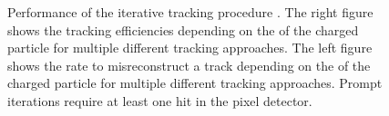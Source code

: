 \begin{figure}[htbp!]
  \begin{center}
\caption{Performance of the iterative tracking procedure \cite{Sirunyan:2017ulk}. The right figure shows the tracking efficiencies depending on the \pt of the charged particle for multiple different tracking approaches. 
         The left figure shows the rate to misreconstruct a track depending on the \pt of the charged particle for multiple different tracking approaches. Prompt iterations require at least one hit in the pixel detector.
  \label{fig:reco_trackingEff}}
  \end{center}
\end{figure}

